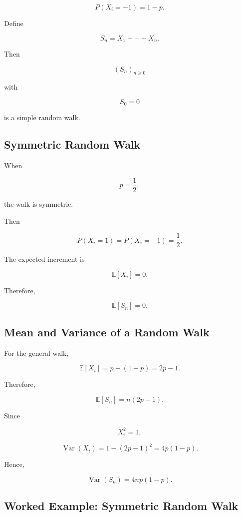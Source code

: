 \[
P(X_i=-1)=1-p.
\]

Define

\[
\boxed{
S_n
=
X_1+\cdots+X_n.
}
\]

Then

\[
(S_n)_{n\geq0}
\]

with

\[
S_0=0
\]

is a simple random walk.

\subsection{Symmetric Random Walk}
\label{subsec:symmetric-random-walk}

When

\[
p=\frac12,
\]

the walk is symmetric.

Then

\[
P(X_i=1)
=
P(X_i=-1)
=
\frac12.
\]

The expected increment is

\[
\mathbb{E}[X_i]=0.
\]

Therefore,

\[
\boxed{
\mathbb{E}[S_n]=0.
}
\]

\subsection{Mean and Variance of a Random Walk}
\label{subsec:random-walk-mean-variance}

For the general walk,

\[
\mathbb{E}[X_i]
=
p-(1-p)
=
2p-1.
\]

Therefore,

\[
\boxed{
\mathbb{E}[S_n]
=
n(2p-1).
}
\]

Since

\[
X_i^2=1,
\]

\[
\operatorname{Var}(X_i)
=
1-(2p-1)^2
=
4p(1-p).
\]

Hence,

\[
\boxed{
\operatorname{Var}(S_n)
=
4np(1-p).
}
\]

\subsection{Worked Example: Symmetric Random Walk}
\label{subsec:worked-symmetric-random-walk}

